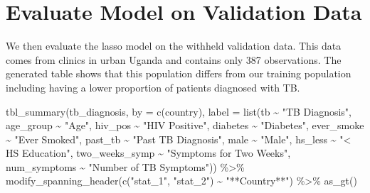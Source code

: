 \documentclass[
  letterpaper,
]{latex/krantz}
\makeatletter
\newenvironment{Shaded}{\begin{snugshade}}{\end{snugshade}}
\newcommand{\AttributeTok}[1]{\textcolor[rgb]{0.40,0.45,0.13}{#1}}
\newcommand{\FunctionTok}[1]{\textcolor[rgb]{0.28,0.35,0.67}{#1}}
\newcommand{\NormalTok}[1]{\textcolor[rgb]{0.00,0.23,0.31}{#1}}
\newcommand{\SpecialCharTok}[1]{\textcolor[rgb]{0.37,0.37,0.37}{#1}}
\newcommand{\StringTok}[1]{\textcolor[rgb]{0.13,0.47,0.30}{#1}}
\newenvironment{kframe}{%
\medskip{}
\setlength{\fboxsep}{.8em}
 \def\at@end@of@kframe{}%
 \ifinner\ifhmode%
  \def\at@end@of@kframe{\end{minipage}}%
  \begin{minipage}{\columnwidth}%
 \fi\fi%
 \def\FrameCommand##1{\hskip\@totalleftmargin \hskip-\fboxsep
 \colorbox{shadecolor}{##1}\hskip-\fboxsep
     \hskip-\linewidth \hskip-\@totalleftmargin \hskip\columnwidth}%
 \MakeFramed {\advance\hsize-\width
   \@totalleftmargin\z@ \linewidth\hsize
   \@setminipage}}%
 {\par\unskip\endMakeFramed%
 \at@end@of@kframe}
\renewenvironment{Shaded}{\begin{kframe}}{\end{kframe}}
\makeatother
\begin{document}
\section{\texorpdfstring{Evaluate Model on Validation Data
}{Evaluate Model on Validation Data  }}\label{evaluate-model-on-validation-data}

We then evaluate the lasso model on the withheld validation data. This
data comes from clinics in urban Uganda and contains only 387
observations. The generated table shows that this population differs
from our training population including having a lower proportion of
patients diagnosed with TB.

\begin{Shaded}
\begin{Highlighting}[]
\FunctionTok{tbl\_summary}\NormalTok{(tb\_diagnosis, }\AttributeTok{by =} \FunctionTok{c}\NormalTok{(country),}
            \AttributeTok{label =} \FunctionTok{list}\NormalTok{(tb }\SpecialCharTok{\textasciitilde{}} \StringTok{"TB Diagnosis"}\NormalTok{,}
\NormalTok{                         age\_group }\SpecialCharTok{\textasciitilde{}} \StringTok{"Age"}\NormalTok{,}
\NormalTok{                         hiv\_pos }\SpecialCharTok{\textasciitilde{}} \StringTok{"HIV Positive"}\NormalTok{,}
\NormalTok{                         diabetes }\SpecialCharTok{\textasciitilde{}} \StringTok{"Diabetes"}\NormalTok{,}
\NormalTok{                         ever\_smoke }\SpecialCharTok{\textasciitilde{}} \StringTok{"Ever Smoked"}\NormalTok{,}
\NormalTok{                         past\_tb }\SpecialCharTok{\textasciitilde{}} \StringTok{"Past TB Diagnosis"}\NormalTok{,}
\NormalTok{                         male }\SpecialCharTok{\textasciitilde{}} \StringTok{"Male"}\NormalTok{,}
\NormalTok{                         hs\_less }\SpecialCharTok{\textasciitilde{}} \StringTok{"\textless{} HS Education"}\NormalTok{,}
\NormalTok{                         two\_weeks\_symp }\SpecialCharTok{\textasciitilde{}} \StringTok{"Symptoms for Two Weeks"}\NormalTok{,}
\NormalTok{                         num\_symptoms }\SpecialCharTok{\textasciitilde{}} \StringTok{"Number of TB Symptoms"}\NormalTok{)) }\SpecialCharTok{\%\textgreater{}\%}
  \FunctionTok{modify\_spanning\_header}\NormalTok{(}\FunctionTok{c}\NormalTok{(}\StringTok{"stat\_1"}\NormalTok{, }\StringTok{"stat\_2"}\NormalTok{) }\SpecialCharTok{\textasciitilde{}} \StringTok{"**Country**"}\NormalTok{) }\SpecialCharTok{\%\textgreater{}\%}
  \FunctionTok{as\_gt}\NormalTok{()}
\end{Highlighting}
\end{Shaded}
\end{document}

